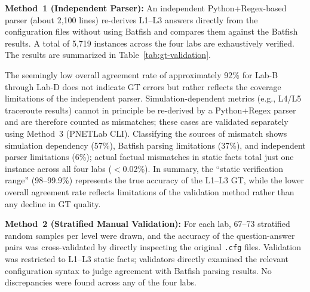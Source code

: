 \textbf{Method~1 (Independent Parser):}
An independent Python+Regex-based parser (about 2,100 lines) re-derives L1--L3 answers directly from the configuration files without using Batfish and compares them against the Batfish results.
A total of 5,719 instances across the four labs are exhaustively verified. The results are summarized in Table~\ref{tab:gt-validation}.


% 

% 

The seemingly low overall agreement rate of approximately 92\% for Lab-B through Lab-D does not indicate GT errors but rather reflects the coverage limitations of the independent parser.
Simulation-dependent metrics (e.g., L4/L5 traceroute results) cannot in principle be re-derived by a Python+Regex parser and are therefore counted as mismatches; these cases are validated separately using Method~3 (PNETLab CLI).
Classifying the sources of mismatch shows simulation dependency (57\%), Batfish parsing limitations (37\%), and independent parser limitations (6\%); actual factual mismatches in static facts total just one instance across all four labs ($<$0.02\%).
In summary, the ``static verification range'' (98--99.9\%) represents the true accuracy of the L1--L3 GT, while the lower overall agreement rate reflects limitations of the validation method rather than any decline in GT quality.

\textbf{Method~2 (Stratified Manual Validation):}
For each lab, 67--73 stratified random samples per level were drawn, and the accuracy of the question-answer pairs was cross-validated by directly inspecting the original \texttt{.cfg} files.
Validation was restricted to L1--L3 static facts; validators directly examined the relevant configuration syntax to judge agreement with Batfish parsing results.
No discrepancies were found across any of the four labs.

